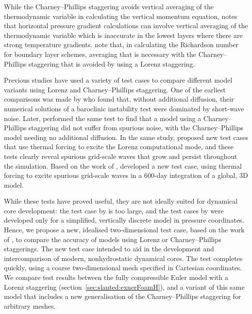 While the Charney--Phillips staggering avoids vertical averaging of the thermodynamic variable in calculating the vertical momentum equation, \citet{davies2005} notes that horizontal pressure gradient calculations can involve vertical averaging of the thermodynamic variable which is inaccurate in the lowest layers where there are strong temperature gradients.
\citet{holdaway2013a} note that, in calculating the Richardson number for boundary layer schemes, averaging that is necessary with the Charney--Phillips staggering that is avoided by using a Lorenz staggering.

Previous studies have used a variety of test cases to compare different model variants using Lorenz and Charney--Phillips staggering.
One of the earliest comparisons was made by \citet{arakawa-moorthi1988} who found that, without additional diffusion, their numerical solutions of a baroclinic instability test were dominated by short-wave noise.
Later, \citet{arakawa-konor1996} performed the same test to find that a model using a Charney--Phillips staggering did not suffer from spurious noise, with the Charney--Phillips model needing no additional diffusion.
In the same study, \citet{arakawa-konor1996} proposed new test cases that use thermal forcing to excite the Lorenz computational mode, and these tests clearly reveal spurious grid-scale waves that grow and persist throughout the simulation.
Based on the work of \citet{arakawa-konor1996}, \citet{untch-hortal2004} developed a new test case, using thermal forcing to excite spurious grid-scale waves in a 600-day integration of a global, 3D model.

While these tests have proved useful, they are not ideally suited for dynamical core development: the test case by \citet{untch-hortal2004} is too large, and the test cases by \citet{arakawa-konor1996} were developed only for a simplified, vertically discrete model in pressure coordinates.
Hence, we propose a new, idealised two-dimensional test case, based on the work of \citet{arakawa-konor1996}, to compare the accuracy of models using Lorenz or Charney--Phillips staggerings.
The new test case intended to aid in the development and intercomparison of modern, nonhydrostatic dynamical cores.  The test completes quickly, using a coarse two-dimensional mesh specified in Cartesian coordinates.
We compare test results between the fully compressible Euler model with a Lorenz staggering (section~\ref{sec:slanted:exnerFoamH}), and a variant of this same model that includes a new generalisation of the Charney--Phillips staggering for arbitrary meshes.

